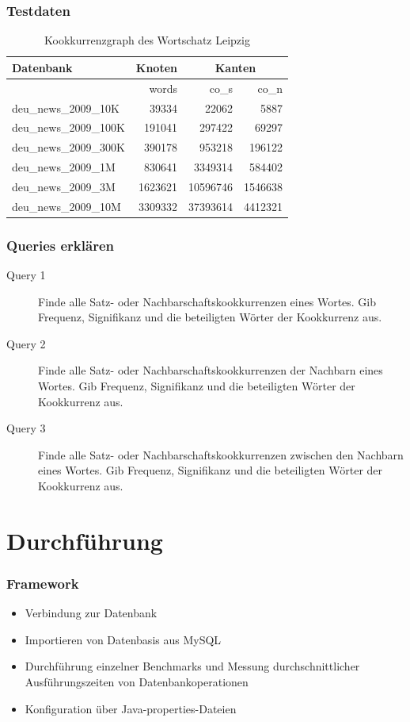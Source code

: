\documentclass{beamer}
\begin{document}
\begin{frame}\frametitle{Testdaten}
	\begin{table}
	\begin{tabular}{|l|r|r|r|}
		\hline
		Datenbank & Knoten & \multicolumn{2}{|c|}{Kanten}\\
		\hline
		 & words & co\_{}s & co\_{}n \\
		\hline
		\hline
		deu\_{}news\_{}2009\_{}10K & 39334 & 22062 & 5887\\
		\hline
		deu\_{}news\_{}2009\_{}100K & 191041 & 297422 & 69297\\
		\hline
		deu\_{}news\_{}2009\_{}300K & 390178 & 953218 & 196122\\
		\hline
		deu\_{}news\_{}2009\_{}1M & 830641 & 3349314 & 584402\\
		\hline
		deu\_{}news\_{}2009\_{}3M & 1623621 & 10596746 & 1546638\\
		\hline
		deu\_{}news\_{}2009\_{}10M & 3309332 & 37393614 & 4412321\\
		\hline
	\end{tabular}
	\caption{Kookkurrenzgraph des Wortschatz Leipzig}
	\end{table}
\end{frame}

\begin{frame}\frametitle{Queries erklären}
\begin{description}
\item[Query 1]Finde alle Satz- oder Nachbarschaftskookkurrenzen eines Wortes. Gib Frequenz, Signifikanz und die beteiligten Wörter der Kookkurrenz aus.
\item[Query 2]Finde alle Satz- oder Nachbarschaftskookkurrenzen der Nachbarn eines Wortes. Gib Frequenz, Signifikanz und die beteiligten Wörter der Kookkurrenz aus.
\item[Query 3]Finde alle Satz- oder Nachbarschaftskookkurrenzen zwischen den Nachbarn eines Wortes. Gib Frequenz, Signifikanz und die beteiligten Wörter der Kookkurrenz aus.
\end{description}
\end{frame}

\section{Durchführung}
\begin{frame}\frametitle{Framework} 
	\begin{itemize}
		\item Verbindung zur Datenbank
		\item Importieren von Datenbasis aus MySQL
		\item Durchführung einzelner Benchmarks und Messung durchschnittlicher Ausführungszeiten von Datenbankoperationen
		\item Konfiguration über Java-properties-Dateien
	\end{itemize} 
\end{frame}
\end{document}
